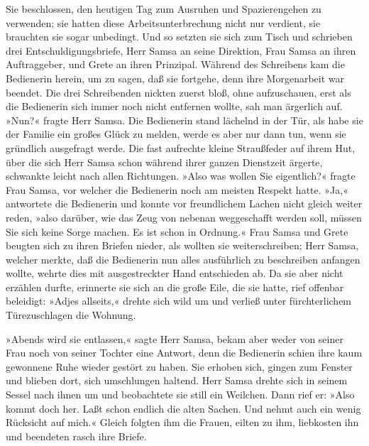 \pagebreak

Sie beschlossen, den heutigen Tag zum Ausruhen und Spazierengehen zu
verwenden; sie hatten diese Arbeitsunterbrechung nicht nur verdient, sie
brauchten sie sogar unbedingt. Und so setzten sie sich zum Tisch und
schrieben drei Entschuldigungsbriefe, Herr Samsa an seine Direktion,
Frau Samsa an ihren Auftraggeber, und Grete an ihren Prinzipal. Während
des Schreibens kam die Bedienerin herein, um zu sagen, daß sie fortgehe,
denn ihre Morgenarbeit war beendet. Die drei Schreibenden nickten zuerst
bloß, ohne aufzuschauen, erst als die Bedienerin sich immer noch nicht
entfernen wollte, sah man ärgerlich auf. »Nun?« fragte Herr Samsa. Die
Bedienerin stand lächelnd in der Tür, als habe sie der Familie ein
großes Glück zu melden, werde es aber nur dann tun, wenn sie gründlich
ausgefragt werde. Die fast aufrechte kleine Straußfeder auf ihrem Hut,
über die sich Herr Samsa schon während ihrer ganzen Dienstzeit ärgerte,
schwankte leicht nach allen Richtungen. »Also was wollen Sie
eigentlich?« fragte Frau Samsa, vor welcher die Bedienerin noch am
meisten Respekt hatte. »Ja,« antwortete die Bedienerin und konnte vor
freundlichem Lachen nicht gleich weiter reden, »also darüber, wie das
Zeug von nebenan weggeschafft werden soll, müssen Sie sich keine Sorge
machen. Es ist schon in Ordnung.« Frau Samsa und Grete beugten sich zu
ihren Briefen nieder, als wollten sie weiterschreiben; Herr Samsa,
welcher merkte, daß die Bedienerin nun alles ausführlich zu beschreiben
anfangen wollte, wehrte dies mit ausgestreckter Hand entschieden ab. Da
sie aber nicht erzählen durfte, erinnerte sie sich an die große Eile,
die sie hatte, rief offenbar beleidigt: »Adjes allseits,« drehte sich
wild um und verließ unter fürchterlichem Türezuschlagen die Wohnung.

»Abends wird sie entlassen,« sagte Herr Samsa, bekam aber weder von
seiner Frau noch von seiner Tochter eine Antwort, denn die Bedienerin
schien ihre kaum gewonnene Ruhe wieder gestört zu haben. Sie erhoben
sich, gingen zum Fenster und blieben dort, sich umschlungen haltend.
Herr Samsa drehte sich in seinem Sessel nach ihnen um und beobachtete
sie still ein Weilchen. Dann rief er: »Also kommt doch her. Laßt schon
endlich die alten Sachen. Und nehmt auch ein wenig Rücksicht auf mich.«
Gleich folgten ihm die Frauen, eilten zu ihm, liebkosten ihn und
beendeten rasch ihre Briefe.

